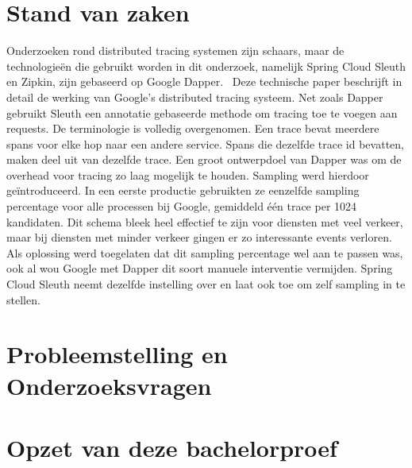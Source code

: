 \section{Stand van zaken}
\label{sec:stand-van-zaken}


Onderzoeken rond distributed tracing systemen zijn schaars, maar de technologieën die gebruikt worden in dit onderzoek, namelijk Spring Cloud Sleuth en Zipkin, zijn gebaseerd op Google Dapper.~\autocite{Sigelman2010} Deze technische paper beschrijft in detail de werking van Google's distributed tracing systeem. Net zoals Dapper gebruikt Sleuth een annotatie gebaseerde methode om tracing toe te voegen aan requests. De terminologie is volledig overgenomen. Een trace bevat meerdere spans voor elke hop naar een andere service. Spans die dezelfde trace id bevatten, maken deel uit van dezelfde trace. Een groot ontwerpdoel van Dapper was om de overhead voor tracing zo laag mogelijk te houden. Sampling werd hierdoor geïntroduceerd. In een eerste productie gebruikten ze eenzelfde sampling percentage voor alle processen bij Google, gemiddeld één trace per 1024 kandidaten. Dit schema bleek heel effectief te zijn voor diensten met veel verkeer, maar bij diensten met minder verkeer gingen er zo interessante events verloren. Als oplossing werd toegelaten dat dit sampling percentage wel aan te passen was, ook al wou Google met Dapper dit soort manuele interventie vermijden. Spring Cloud Sleuth neemt dezelfde instelling over en laat ook toe om zelf sampling in te stellen. \\

\section{Probleemstelling en Onderzoeksvragen}
\label{sec:onderzoeksvragen}


\section{Opzet van deze bachelorproef}
\label{sec:opzet-bachelorproef}

